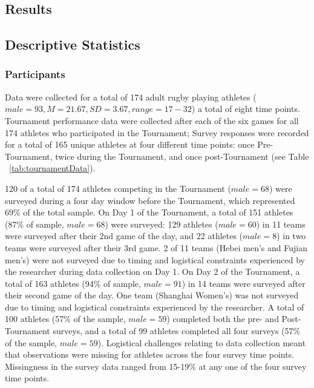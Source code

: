 \begin{CJK}{UTF8}{gbsn}
\section{Results}



\subsection{Descriptive Statistics}

  \subsubsection{Participants}

Data were collected for a total of 174 adult rugby playing athletes ($male = 93, M = 21.67, SD = 3.67, range = 17-32$) a total of eight time points. Tournament performance data were collected after each of the six games for all 174 athletes who participated in the Tournament;  Survey responses were recorded for a total of 165 unique athletes at four different time points: once Pre-Tournament, twice during the Tournament, and once post-Tournament (see Table ~\ref{tab:tournamentData}).




120 of a total of 174 athletes competing in the Tournament ($male = 68$) were surveyed during a four day window before the Tournament, which represented 69\% of the total sample.  On Day 1 of the Tournament, a total of 151 athletes (87\% of sample, $male = 68$) were surveyed: 129 athletes ($male = 60$) in 11 teams were surveyed after their 2nd game of the day, and 22 athletes ($male = 8$) in two teams were surveyed after their 3rd game. 2 of 11 teams (Hebei men’s and Fujian men’s) were not surveyed due to timing and logistical constraints experienced by the researcher during data collection on Day 1. On Day 2 of the Tournament, a total of 163 athletes (94\% of sample, $male = 91$) in 14 teams were surveyed after their second game of the day. One team (Shanghai Women’s) was not surveyed due to timing and logistical constraints experienced by the researcher. A total of 100 athletes (57\% of the sample, $male = 59$) completed both the pre- and Post-Tournament surveys, and a total of 99 athletes completed all four surveys (57\% of the sample, $male = 59$). Logistical challenges relating to data collection meant that observations were missing for athletes across the four survey time points. Missingness in the survey data ranged from 15-19\% at any one of the four survey time points.\\




\end{CJK}

